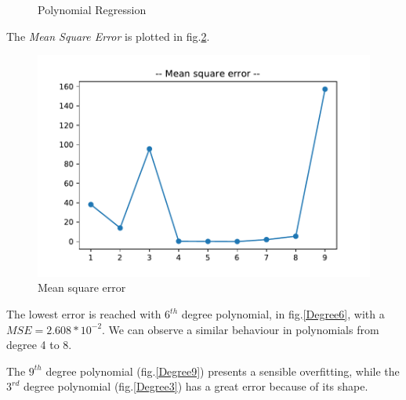 \documentclass[10pt,a4paper]{article}
\begin{document}
\begin{figure}[!h]
	\qquad\qquad
	\qquad\qquad
	\caption{Polynomial Regression\label{Polyreg}}
	\end{figure}
	
	The \emph{Mean Square Error} is plotted in fig.\ref{fig:MeanSquareError}.
	
	\begin{figure}[!h]
	\centering
	\includegraphics[width=0.7\linewidth]{../MeanSquareError}
	\caption{Mean square error}
	\label{fig:MeanSquareError}
	\end{figure}
	
	
	The lowest error is reached with $6^{th}$ degree polynomial, in fig.\ref{Degree6}, with a $MSE=2.608*10^{-2}$. We can observe a similar behaviour in polynomials from degree 4 to 8. 
	
	The $9^{th}$ degree polynomial (fig.\ref{Degree9}) presents a sensible overfitting, while the $3^{rd}$ degree polynomial (fig.\ref{Degree3}) has a great error because of its shape. 
	
\end{document}
